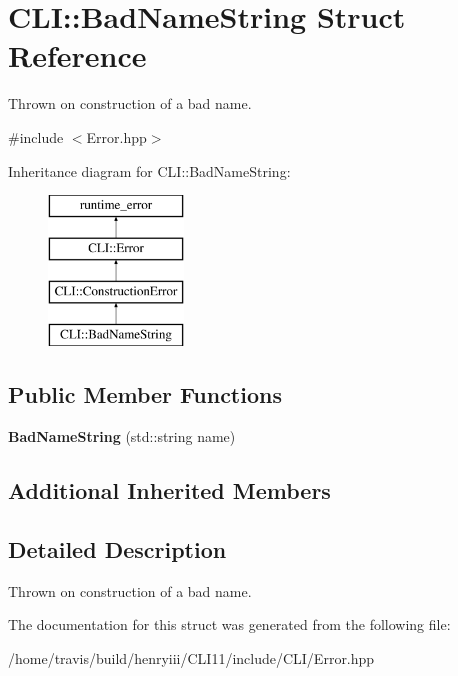 \hypertarget{struct_c_l_i_1_1_bad_name_string}{}\section{C\+LI\+:\+:Bad\+Name\+String Struct Reference}
\label{struct_c_l_i_1_1_bad_name_string}


Thrown on construction of a bad name.  




{\ttfamily \#include $<$Error.\+hpp$>$}

Inheritance diagram for C\+LI\+:\+:Bad\+Name\+String\+:\begin{figure}[H]
\begin{center}
\leavevmode
\includegraphics[height=4.000000cm]{struct_c_l_i_1_1_bad_name_string}
\end{center}
\end{figure}
\subsection*{Public Member Functions}
\begin{DoxyCompactItemize}
\item 
\mbox{\label{struct_c_l_i_1_1_bad_name_string_ab1b309894dd5d3674a62c4fed7615fe9}} 
{\bfseries Bad\+Name\+String} (std\+::string name)
\end{DoxyCompactItemize}
\subsection*{Additional Inherited Members}


\subsection{Detailed Description}
Thrown on construction of a bad name. 

The documentation for this struct was generated from the following file\+:\begin{DoxyCompactItemize}
\item 
/home/travis/build/henryiii/\+C\+L\+I11/include/\+C\+L\+I/Error.\+hpp\end{DoxyCompactItemize}

